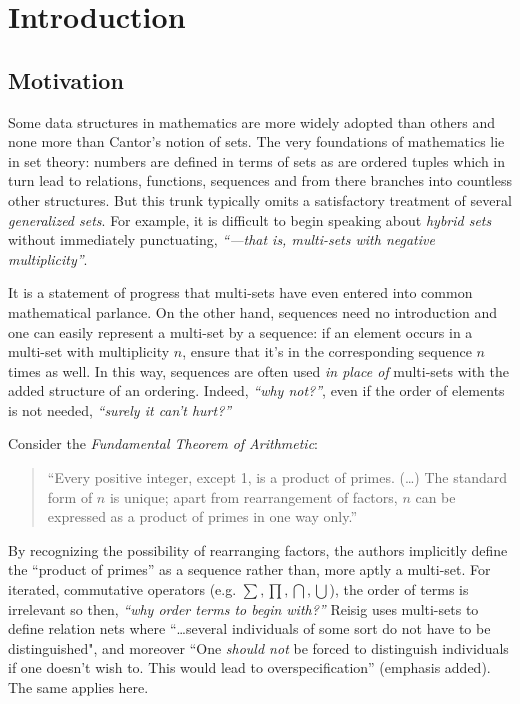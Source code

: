 \chapter{Introduction}
\doublespacing


\section{Motivation}


Some data structures in mathematics are more widely adopted than others and none more than Cantor's notion of sets.
The very foundations of mathematics lie in set theory: numbers are defined in terms of sets as are ordered tuples 
which in turn lead to relations, functions, sequences and from there branches into countless other structures.
But this trunk typically omits a satisfactory treatment of several \emph{generalized sets}.
For example, it is difficult to begin speaking about \emph{hybrid sets} without immediately punctuating, 
\emph{``---that is, multi-sets with negative multiplicity''}.


It is a statement of progress that multi-sets have even entered into common mathematical parlance.
On the other hand, sequences need no introduction and one can easily represent a multi-set by a sequence: 
if an element occurs in a multi-set with multiplicity $n$, ensure that it's in the corresponding sequence $n$ times as well.
In this way, sequences are often used \emph{in place of} multi-sets with the added structure of an ordering.
Indeed,  \emph{``why not?''}, even if the order of elements is not needed, \emph{``surely it can't hurt?''}


Consider the \emph{Fundamental Theorem of Arithmetic}:
\begin{quote}
	``Every positive integer, except 1, is a product of primes. 
	(\ldots) 
	The standard form of $n$ is unique; 
	apart from rearrangement of factors, $n$ can be expressed as a product of primes in one way only.''
\end{quote}
By recognizing the possibility of rearranging factors, the authors implicitly define the ``product of primes'' 
as a sequence rather than, more aptly a multi-set.
For iterated, commutative operators (e.g. $\sum, \prod, \bigcap, \bigcup$), the order of terms is irrelevant so then, 
\emph{``why order terms to begin with?''}
Reisig \cite{reisig1985petri} uses multi-sets to define relation nets where 
``\ldots several individuals of some sort do not have to be distinguished", and moreover
 ``One \emph{should not} be forced to distinguish individuals if one doesn't wish to.  This would lead to overspecification''
(emphasis added). The same applies here.


